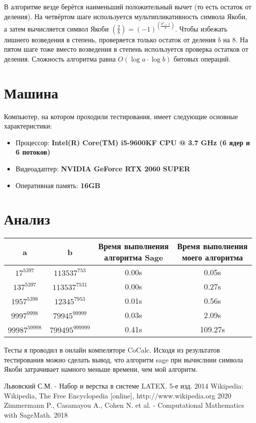 \documentclass[11pt]{article}
\begin{document}
В алгоритме везде берётся наименьший положительный вычет (то есть остаток от деления).
На четвёртом шаге используется мультипликативность символа Якоби, а затем вычисляется символ Якоби $\left(\frac{2}{b}\right)=(-1)^{\left(\frac{b^2-1}{8}\right)}$. Чтобы избежать лишнего возведения в степень, проверяется только остаток от деления $b$ на 8. На пятом шаге тоже вместо возведения в степень используется проверка остатков от деления. Сложность алгоритма равна $O(\log{a}\cdot\log{b})$ битовых операций.

\section{Машина}
Компьютер, на котором проходили тестирования, имеет следующие основные характеристики:
\begin{itemize}
\item Процессор: \textbf{Intel(R) Core(TM) i5-9600KF CPU @ 3.7 GHz (6 ядер и 6 потоков)}
\item Видеоадаптер: \textbf{NVIDIA GeForce RTX 2060 SUPER}
\item Оперативная память: \textbf{16GB}
\end{itemize}
\section{Анализ}

\begin{tabular}{|c|c|c|c|}
\hline
a & b & Время выполнения алгоритма Sage & Время выполнения моего алгоритма\\
\hline
$17^{5397}$ & $113537^{753}$ & 0.00s & 0.05s\\
$137^{5397}$ & $113537^{7531}$ & 0.00s & 0.27s\\
$1957^{5398}$ & $12345^{7953}$ & 0.01s & 0.56s\\
$9997^{9998}$ & $79945^{99999}$ & 0.03s & 2.09s\\
$99987^{59998}$ & $799495^{999999}$ & 0.41s & 109.27s\\
\hline
\end{tabular}

Тесты я проводил в онлайн компеляторе CoCalc. Исходя из результатов тестирования можно сделать вывод, что алгоритм sage при вычислнии символа Якоби затрачивает намного меньше времени, чем мой алгоритм.

\begin{thebibliography}{3}

	 Львовский С.М. - Набор и верстка в системе LATEX. 5-е изд. 2014
	 Wikipedia: Wikipedia, The Free Encyclopedia [online], http://www.wikipedia.org  2020
	 Zimmermann P., Casamayou A., Cohen N. et al. - Computational Mathematics with SageMath. 2018

\end{thebibliography}
\end{document}
